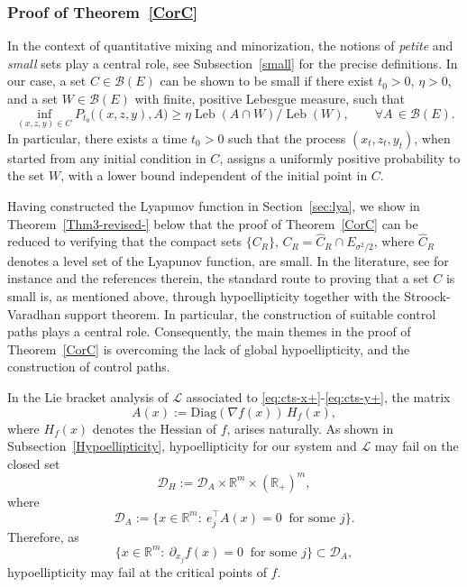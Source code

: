 \documentclass[11pt, a4paper,leqno]{amsart}
\theoremstyle{definition}
\numberwithin{equation}{section}
\begin{document}
\subsubsection{Proof of Theorem~\ref{CorC}} In the context of quantitative mixing and minorization, the notions of \emph{petite} and \emph{small} sets play a central role, see Subsection~\ref{small}
for the precise definitions. In our case, a set $C\in\mathcal B(E)$ can be
shown to be small if there exist $t_0>0$, $\eta>0$, and a set $W\in\mathcal B(E)$ with finite,
positive Lebesgue measure, such that
\[
\inf_{(x,z,y)\in C} P_{t_0}\bigl((x,z,y),A\bigr) \geq \eta {\operatorname{Leb}(A \cap W)}/{\operatorname{Leb}(W)},\qquad \forall A\, \in\mathcal B(E).
\]
 In particular, there exists a time $t_0>0$ such that the process
$(x_t,z_t,y_t)$, when started from any initial condition in $C$, assigns
a uniformly positive probability to the set $W$, with a lower bound
independent of the initial point in $C$.




Having constructed the Lyapunov function in Section~\ref{sec:lya}, we show in
Theorem~\ref{Thm3-revised-} below that the proof of Theorem~\ref{CorC} can be reduced to verifying that the compact sets $\{C_R\}$, $C_R=\hat C_R\cap E_{\sigma^2/2}$, where \(\hat C_R\) denotes a level set of the Lyapunov function, are small. In the literature, see for instance
\cite{MattinglyStuartHigham2002,HerzogMattingly2015} and the references
therein, the standard route to proving that a set \(C\) is small
is, as mentioned above, through hypoellipticity together with the Stroock-Varadhan support
theorem. In particular, the construction of suitable
control paths plays a central role. Consequently, the  main themes in the proof of Theorem~\ref{CorC} is overcoming the lack of global hypoellipticity,  and the construction of control paths.




In the Lie bracket analysis of ${\mathcal L}$ associated to \eqref{eq:cts-x+}-\eqref{eq:cts-y+}, the matrix
\begin{equation}\label{matt}
A(x):=\mathrm{Diag}(\nabla f(x))\,H_f(x),
\end{equation}
where $H_f(x)$ denotes the Hessian of $f$, arises naturally. As shown in Subsection~\ref{Hypoellipticity},
hypoellipticity for our system and ${\mathcal L}$ may fail on the closed set
\begin{equation}\label{matt+}
\mathcal D_H
:=
\mathcal D_A
\times\mathbb R^m\times(\mathbb R_+)^m,
\end{equation}
where \begin{equation}\label{matt+++}
\mathcal D_A:=
\{x\in\mathbb R^m:\ e_j^\top A(x)=0
\ \mbox{ for some } j\}.
\end{equation}
Therefore, as
\begin{equation}\label{matt+++a}
\{x\in\mathbb R^m:\ \partial_{x_j}f(x)=0
\ \mbox{ for some } j\}\subset\mathcal D_A,
\end{equation}
hypoellipticity may fail at the critical points of $f$.
\end{document}

